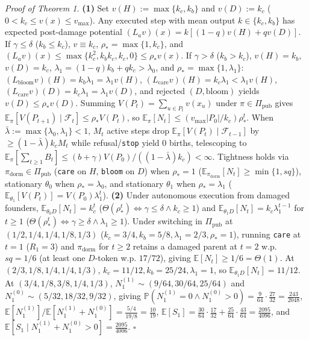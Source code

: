 \documentclass[12pt,letterpaper]{article}
\begin{document}
\emph{Proof of Theorem 1.} \textbf{(1)} Set \(v(H) := \max\{k_c, k_b\}\)
and \(v(D) := k_c\) (\(0 < k_c \le v(x) \le v_{\max}\)). Any executed
step with mean output \(k \in \{k_c, k_b\}\) has expected post-damage
potential \((L_a v)(x) = k[(1-q)v(H) + q v(D)]\). If
\(\gamma \le \delta\) (\(k_b \le k_c\)), \(v \equiv k_c\),
\(\rho_* = \max\{1, k_c\}\), and
\((L_a v)(x) \le \max\{k_c^2, k_b k_c, k_c, 0\} \le \rho_* v(x)\). If
\(\gamma > \delta\) (\(k_b > k_c\)), \(v(H)=k_b\), \(v(D)=k_c\),
\(\lambda_1 = (1-q)k_b + q k_c > \lambda_0\), and
\(\rho_* = \max\{1, \lambda_1\}\):
\((L_{\mathrm{bloom}}v)(H) = k_b \lambda_1 = \lambda_1 v(H)\),
\((L_{\mathrm{care}}v)(H) = k_c \lambda_1 < \lambda_1 v(H)\),
\((L_{\mathrm{care}}v)(D) = k_c \lambda_1 = \lambda_1 v(D)\), and
rejected \((D,\mathrm{bloom})\) yields \(v(D) \le \rho_* v(D)\). Summing
\(V(P_t) = \sum_{u\in P_t} v(x_u)\) under \(\pi \in \Pi_{\mathrm{pub}}\)
gives
\(\mathbb{E}_\pi[V(P_{t+1})\mid \mathcal{F}_t] \le \rho_* V(P_t)\), so
\(\mathbb{E}_\pi[N_t] \le (v_{\max}|P_0|/k_c)\rho_*^t\). When
\(\bar{\lambda}:=\max\{\lambda_0,\lambda_1\}<1\), \(M_t\) active steps
drop \(\mathbb{E}_\pi[V(P_t)\mid\mathcal{F}_{t-1}]\) by
\(\ge (1-\bar{\lambda})k_c M_t\) while refusal/\texttt{stop} yield \(0\)
births, telescoping to
\(\mathbb{E}_\pi[\sum_{t\ge 1} B_t] \le (b+\gamma)V(P_0)/((1-\bar{\lambda})k_c) < \infty\).
Tightness holds via \(\pi_{\mathrm{dorm}} \in \Pi_{\mathrm{pub}}\)
(\texttt{care} on \(H\), \texttt{bloom} on \(D\)) when \(\rho_*=1\)
(\(\mathbb{E}_{\pi_{\mathrm{dorm}}}[N_t] \ge \min\{1, sq\}\)),
stationary \(\theta_0\) when \(\rho_*=\lambda_0\), and stationary
\(\theta_1\) when \(\rho_*=\lambda_1\)
(\(\mathbb{E}_{\theta_1}[V(P_t)] = V(P_0)\lambda_1^t\)). \textbf{(2)}
Under autonomous execution from damaged founders,
\(\mathbb{E}_{\theta_0 D}[N_t] = k_c^t\)
(\(\Theta(\rho_*^t) \iff \gamma\le\delta \land k_c\ge 1\)) and
\(\mathbb{E}_{\theta_1 D}[N_t] = k_c \lambda_1^{t-1}\) for \(t \ge 1\)
(\(\Theta(\rho_*^t) \iff \gamma\ge\delta \land \lambda_1\ge 1\)). Under
switching in \(\Pi_{\mathrm{pub}}\) at \((1/2,1/4,1/4,1/8,1/3)\)
(\(k_c=3/4, k_b=5/8, \lambda_1=2/3, \rho_*=1\)), running \texttt{care}
at \(t=1\) (\(R_1=3\)) and \(\pi_{\mathrm{dorm}}\) for \(t\ge 2\)
retains a damaged parent at \(t=2\) w.p. \(sq = 1/6\) (at least one
\(D\)-token w.p. \(17/72\)), giving
\(\mathbb{E}[N_t] \ge 1/6 = \Theta(1)\). At \((2/3,1/8,1/4,1/4,1/3)\),
\(k_c=11/12, k_b=25/24, \lambda_1=1\), so
\(\mathbb{E}_{\theta_1 D}[N_t] = 11/12\). At \((3/4,1/8,3/8,1/4,1/3)\),
\(N_1^{(1)} \sim (9/64, 30/64, 25/64)\) and
\(N_1^{(0)} \sim (5/32, 18/32, 9/32)\), giving
\(\mathbb{P}(N_1^{(1)}=0 \land N_1^{(0)}>0) = \frac{9}{64}\cdot\frac{27}{32} = \frac{243}{2048}\),
\(\mathbb{E}[N_1^{(1)}]/\mathbb{E}[N_1^{(1)}+N_1^{(0)}] = \frac{5/4}{19/8} = \frac{10}{19}\),
\(\mathbb{E}[S_1] = \frac{30}{64}\cdot\frac{17}{32} + \frac{25}{64}\cdot\frac{43}{64} = \frac{2095}{4096}\),
and
\(\mathbb{E}[S_1 \mid N_1^{(1)}+N_1^{(0)} > 0] = \frac{2095}{4006}\).
\(\square\)

\clearpage
\begingroup
\onehalfspacing
\setlength{\bibsep}{4pt}


\endgroup
\end{document}
